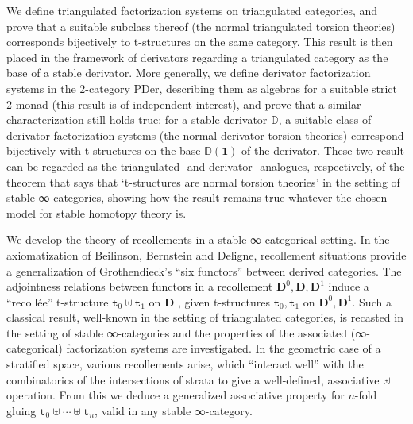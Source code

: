 \begin{eyenumerate}
   \item {}
   {}
   {We define triangulated factorization systems on triangulated categories, and prove that a suitable subclass thereof (the normal triangulated torsion theories) corresponds bijectively to t-structures on the same category. This result is then placed in the framework of derivators regarding a triangulated category as the base of a stable derivator. More generally, we define derivator factorization systems in the 2-category $\mathrm{PDer}$, describing them as algebras for a suitable strict 2-monad (this result is of independent interest), and prove that a similar characterization still holds true: for a stable derivator $\mathbb D$, a suitable class of derivator factorization systems (the normal derivator torsion theories) correspond bijectively with t-structures on the base $\mathbb{D}(\textbf{1})$ of the derivator. These two result can be regarded as the triangulated- and derivator- analogues, respectively, of the theorem that says that `t-structures are normal torsion theories' in the setting of stable ∞-categories, showing how the result remains true whatever the chosen model for stable homotopy theory is.}
   \item {}
   {}
   {We develop the theory of recollements in a stable ∞-categorical setting. In the axiomatization of Beilinson, Bernstein and Deligne, recollement situations provide a generalization of Grothendieck's ``six functors'' between derived categories. The adjointness relations between functors in a recollement $\textbf{D}^0, \textbf{D} , \textbf{D}^1$ induce a ``recoll\'ee'' t-structure $\texttt{t}_0\uplus\texttt{t}_1$ on $\textbf{D}$ , given t-structures $\texttt{t}_0,\texttt{t}_1$ on $\textbf{D}^0, \textbf{D}^1$. Such a classical result, well-known in the setting of triangulated categories, is recasted in the setting of stable ∞-categories and the properties of the associated (∞-categorical) factorization systems are investigated. In the geometric case of a stratified space, various recollements arise, which ``interact well'' with the combinatorics of the intersections of strata to give a well-defined, associative $\uplus$ operation. From this we deduce a generalized associative property for $n$-fold gluing $\texttt{t}_0\uplus\cdots\uplus \texttt{t}_n$, valid in any stable ∞-category.}
   \item {}

\end{eyenumerate}
